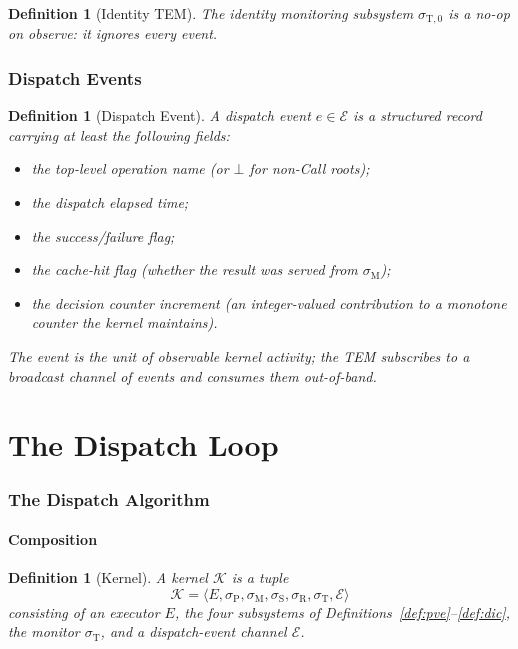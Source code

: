 \documentclass[twocolumn,11pt,a4paper]{article}
\newtheorem{definition}[theorem]{Definition}
\newcommand{\Kernel}{\mathcal{K}}
\newcommand{\Sub}{\sigma}
\newcommand{\Exec}{E}
\newcommand{\Evt}{\mathcal{E}}
\newcommand{\Pve}{\Sub_{\mathrm{P}}}
\newcommand{\Cmm}{\Sub_{\mathrm{M}}}
\newcommand{\Pss}{\Sub_{\mathrm{S}}}
\newcommand{\Dic}{\Sub_{\mathrm{R}}}
\newcommand{\Tem}{\Sub_{\mathrm{T}}}
\begin{document}
\begin{definition}[Identity TEM]
\label{def:noop-tem}
The \emph{identity monitoring subsystem} $\sigma_{\mathrm{T},0}$ is a no-op on observe: it ignores every event.
\end{definition}

\section{Dispatch Events}
\label{sec:events}

\begin{definition}[Dispatch Event]
\label{def:event}
A \emph{dispatch event} $e \in \Evt$ is a structured record carrying at least the following fields:
\begin{itemize}[nosep,leftmargin=*]
\item the top-level operation name (or $\bot$ for non-Call roots);
\item the dispatch elapsed time;
\item the success/failure flag;
\item the cache-hit flag (whether the result was served from $\Cmm$);
\item the decision counter increment (an integer-valued contribution to a monotone counter the kernel maintains).
\end{itemize}
The event is the unit of observable kernel activity; the TEM subscribes to a broadcast channel of events and consumes them out-of-band.
\end{definition}

\part{The Dispatch Loop}

\section{The Dispatch Algorithm}
\label{sec:dispatch}

\subsection{Composition}

\begin{definition}[Kernel]
\label{def:kernel}
A \emph{kernel} $\Kernel$ is a tuple
\[
\Kernel = \langle \Exec, \Pve, \Cmm, \Pss, \Dic, \Tem, \Evt \rangle
\]
consisting of an executor $\Exec$, the four subsystems of Definitions~\ref{def:pve}--\ref{def:dic}, the monitor $\Tem$, and a dispatch-event channel $\Evt$.
\end{definition}
\end{document}
